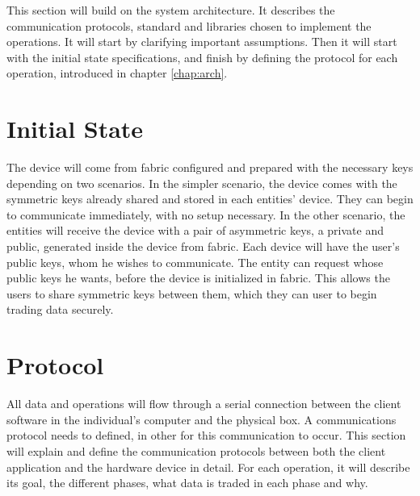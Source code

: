 \cleardoublepage
\label{chap:solution}

This section will build on the system architecture. It describes the communication protocols, standard and libraries chosen to implement the operations. It will start by clarifying important assumptions. Then it will start with the initial state specifications, and finish by defining the protocol for each operation, introduced in chapter \ref{chap:arch}.

\section{Initial State}\label{chap:solution:initial-state}

The device will come from fabric configured and prepared with the necessary keys depending on two scenarios. In the simpler scenario, the device comes with the symmetric keys already shared and stored in each entities' device. They can begin to communicate immediately, with no setup necessary.
In the other scenario, the entities will receive the device with a pair of asymmetric keys, a private and public, generated inside the device from fabric. Each device will have the user's public keys, whom he wishes to communicate. The entity can request whose public keys he wants, before the device is initialized in fabric. This allows the users to share symmetric keys between them, which they can user to begin trading data securely.

\section{Protocol}\label{chap:solution:protocol}

All data and operations will flow through a serial connection between the client software in the individual's computer and the physical box. A communications protocol needs to defined, in other for this communication to occur.
This section will explain and define the communication protocols between both the client application and the hardware device in detail. For each operation, it will describe its goal, the different phases, what data is traded in each phase and why.

